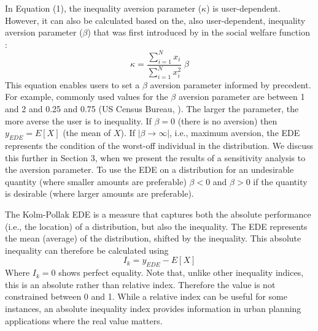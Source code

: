 \documentclass[final,3p,times,onecolumn,sort&compress]{elsarticle}
\begin{document}
In Equation (1), the inequality aversion parameter ($\kappa$) is user-dependent.
However, it can also be calculated based on the, also user-dependent, inequality aversion parameter ($\beta$) that was first introduced by \cite{Atkinson1970-mr} in the social welfare function \citep{Sheriff2020-ge}:
\begin{equation}
    \label{kappa}
    \kappa = \frac{\sum_{i=1}^N x_i}{\sum_{i=1}^N x_i^2} \; \beta 
\end{equation}
This equation enables users to set a $\beta$ aversion parameter informed by precedent.
For example, commonly used values for the $\beta$ aversion parameter are between 1 and 2 \citep{Atkinson1970-mr} and 0.25 and 0.75 (US Census Bureau, \cite{Jones2000-xv}).
The larger the parameter, the more averse the user is to inequality.
If $\beta=0$ (there is no aversion) then $y_{EDE}=E[X]$ (the mean of $X$). 
If $\left| \beta \rightarrow \infty \right|$, i.e., maximum aversion, the EDE represents the condition of the worst-off individual in the distribution. 
We discuss this further in Section 3, when we present the results of a sensitivity analysis to the aversion parameter.
To use the EDE on a distribution for an undesirable quantity (where smaller amounts are preferable) $\beta<0$ and $\beta>0$ if the quantity is desirable (where larger amounts are preferable). 

The Kolm-Pollak EDE is a measure that captures both the absolute performance (i.e., the location) of a distribution, but also the inequality. 
The EDE represents the mean (average) of the distribution, shifted by the inequality.
This absolute inequality can therefore be calculated using
\begin{equation}
    I_k = y_{EDE} - E[X]
\end{equation}
Where $I_k = 0$ shows perfect equality.
Note that, unlike other inequality indices, this is an absolute rather than relative index.
Therefore the value is not constrained between 0 and 1.
While a relative index can be useful for some instances, an absolute inequality index provides information in urban planning applications where the real value matters.
    
\end{document}
